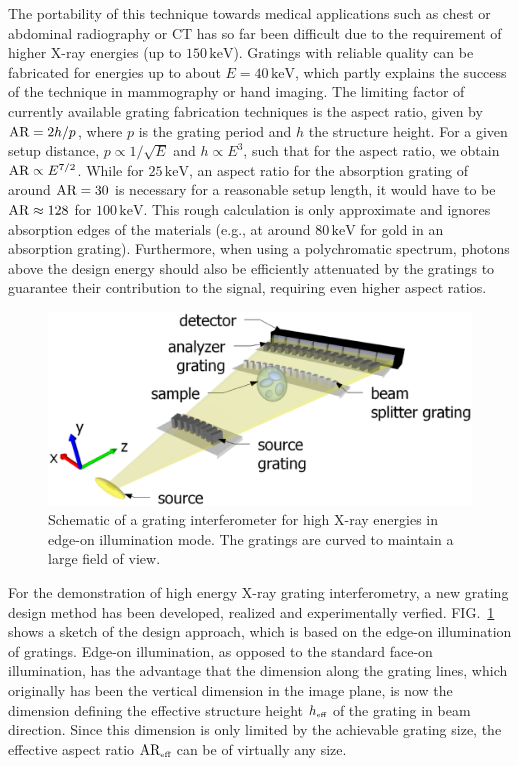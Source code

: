 \documentclass[aps,prl,floatfix,twocolumn,10pt]{revtex4-1}  %
\newcommand{\unit}[1]{\ensuremath{\, \mathrm{#1}}}
\newcommand{\msub}[1]{\ensuremath{\textnormal{\begin{tiny}#1\end{tiny}}}}
\begin{document}
The portability of this technique towards medical applications such as chest or abdominal radiography or CT has so far been difficult due to the requirement of higher X-ray energies (up to $150 \unit{keV}$). Gratings with reliable quality can be fabricated for energies up to about $E=40 \unit{keV}$, which partly explains the success of the technique in mammography or hand imaging. The limiting factor of currently available grating fabrication techniques is the aspect ratio, given by $\textnormal{AR} = 2h/p$, where $p$ is the grating period and $h$ the structure height. For a given setup distance, $p \propto 1/\sqrt{E}$ and $h \propto E^3$, such that for the aspect ratio, we obtain $\textnormal{AR} \propto E^{7/2}$. While for $25 \unit{keV}$, an aspect ratio for the absorption grating of around $\textnormal{AR}=30$ is necessary for a reasonable setup length, it would have to be $\textnormal{AR} \approx 128$ for $100 \unit{keV}$. This rough calculation is only approximate and ignores absorption edges of the materials (e.g., at around $80 \unit{keV}$ for gold in an absorption grating). Furthermore, when using a polychromatic spectrum, photons above the design energy should also be efficiently attenuated by the gratings to guarantee their contribution to the signal, requiring even higher aspect ratios.
\begin{figure} [ht]
  \includegraphics[width = \linewidth]{figures/figure1.eps}
  \caption{Schematic of a grating interferometer for high X-ray energies in edge-on illumination mode. The gratings are curved to maintain a large field of view.}
  \label{Fig:schematic}
\end{figure}

For the demonstration of high energy X-ray grating interferometry, a new grating design method has been developed, realized and experimentally verfied. FIG.~\ref{Fig:schematic} shows a sketch of the design approach, which is based on the edge-on illumination of gratings. Edge-on illumination, as opposed to the standard face-on illumination, has the advantage that the dimension along the grating lines, which originally has been the vertical dimension in the image plane, is now the dimension defining the effective structure height $h_\msub{eff}$ of the grating in beam direction. Since this dimension is only limited by the achievable grating size, the effective aspect ratio $\textnormal{AR}_\msub{eff}$ can be of virtually any size.
\end{document}
